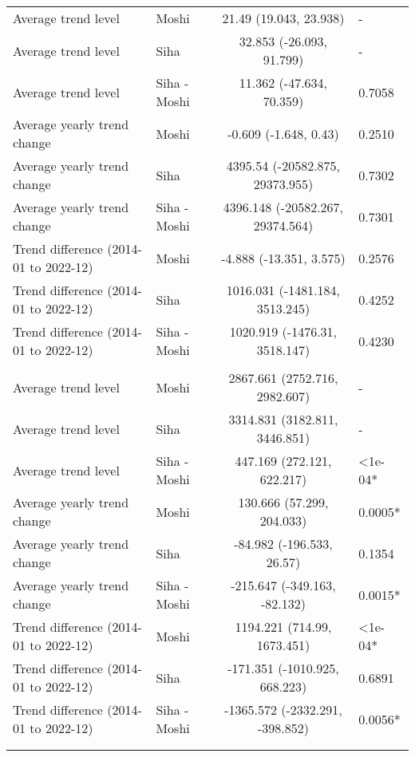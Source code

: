 \begin{longtable}{l|lcl}
\midrule\addlinespace[2.5pt]
\multicolumn{4}{l}{Typhoid} \\ 
\midrule\addlinespace[2.5pt]
Average trend level & Moshi & 21.49 (19.043, 23.938) & - \\ 
Average trend level & Siha & 32.853 (-26.093, 91.799) & - \\ 
Average trend level & Siha - Moshi & 11.362 (-47.634, 70.359) & 0.7058 \\ 
Average yearly trend change & Moshi & -0.609 (-1.648, 0.43) & 0.2510 \\ 
Average yearly trend change & Siha & 4395.54 (-20582.875, 29373.955) & 0.7302 \\ 
Average yearly trend change & Siha - Moshi & 4396.148 (-20582.267, 29374.564) & 0.7301 \\ 
Trend difference (2014-01 to 2022-12) & Moshi & -4.888 (-13.351, 3.575) & 0.2576 \\ 
Trend difference (2014-01 to 2022-12) & Siha & 1016.031 (-1481.184, 3513.245) & 0.4252 \\ 
Trend difference (2014-01 to 2022-12) & Siha - Moshi & 1020.919 (-1476.31, 3518.147) & 0.4230 \\ 
\midrule\addlinespace[2.5pt]
\multicolumn{4}{l}{Upper Respiratory Infections} \\ 
\midrule\addlinespace[2.5pt]
Average trend level & Moshi & 2867.661 (2752.716, 2982.607) & - \\ 
Average trend level & Siha & 3314.831 (3182.811, 3446.851) & - \\ 
Average trend level & Siha - Moshi & 447.169 (272.121, 622.217) & <1e-04* \\ 
Average yearly trend change & Moshi & 130.666 (57.299, 204.033) & 0.0005* \\ 
Average yearly trend change & Siha & -84.982 (-196.533, 26.57) & 0.1354 \\ 
Average yearly trend change & Siha - Moshi & -215.647 (-349.163, -82.132) & 0.0015* \\ 
Trend difference (2014-01 to 2022-12) & Moshi & 1194.221 (714.99, 1673.451) & <1e-04* \\ 
Trend difference (2014-01 to 2022-12) & Siha & -171.351 (-1010.925, 668.223) & 0.6891 \\ 
Trend difference (2014-01 to 2022-12) & Siha - Moshi & -1365.572 (-2332.291, -398.852) & 0.0056* \\ 
\midrule\addlinespace[2.5pt]
\multicolumn{4}{l}{Urinary Tract Infections} \\ 
\midrule\addlinespace[2.5pt]

\end{longtable}
